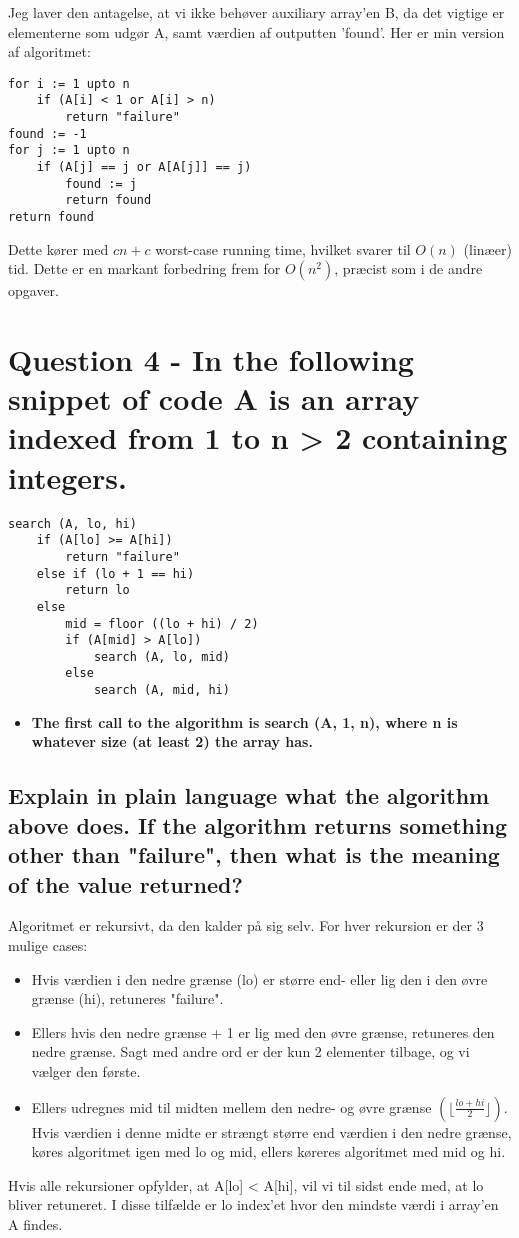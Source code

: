 \documentclass[a4paper,12pt]{article}
\begin{document}
Jeg laver den antagelse, at vi ikke behøver auxiliary array'en B, da det vigtige er elementerne som udgør A, samt værdien af outputten 'found'.
Her er min version af algoritmet:
\begin{lstlisting}
for i := 1 upto n                   
    if (A[i] < 1 or A[i] > n)       
        return "failure"            
found := -1                         
for j := 1 upto n                   
    if (A[j] == j or A[A[j]] == j)  
        found := j                  
        return found                
return found                        
\end{lstlisting}
Dette kører med $cn + c$ worst-case running time, hvilket svarer til $O(n)$ (linæer) tid. Dette er en markant forbedring frem for $O(n^2)$, præcist som i de andre opgaver.

\section[Question 4]{Question 4 - In the following snippet of code A is an array indexed from 1 to n > 2 containing integers.}

\begin{lstlisting}
search (A, lo, hi)
    if (A[lo] >= A[hi])
        return "failure"
    else if (lo + 1 == hi)
        return lo
    else 
        mid = floor ((lo + hi) / 2)
        if (A[mid] > A[lo])
            search (A, lo, mid)
        else
            search (A, mid, hi)
\end{lstlisting}
\begin{itemize}
    \item[] \textbf{The first call to the algorithm is search (A, 1, n), where n is whatever size (at least 2) the
    array has.}
\end{itemize}

\subsection[]{Explain in plain language what the algorithm above does. If the algorithm returns something other than "failure", then what is the meaning of the value returned?}
    
Algoritmet er rekursivt, da den kalder på sig selv. For hver rekursion er der 3 mulige cases:
\begin{itemize}
    \item Hvis værdien i den nedre grænse (lo) er større end- eller lig den i den øvre grænse (hi), retuneres "failure". 
    \item Ellers hvis den nedre grænse + 1 er lig med den øvre grænse, retuneres den nedre grænse. Sagt med andre ord er der kun 2 elementer tilbage, og vi vælger den første.
    \item Ellers udregnes mid til midten mellem den nedre- og øvre grænse $(\lfloor\frac{lo + hi}{2}\rfloor)$. Hvis værdien i denne midte er strængt større end værdien i den nedre grænse, køres algoritmet igen med lo og mid, ellers køreres algoritmet med mid og hi.
\end{itemize}
Hvis alle rekursioner opfylder, at A[lo] < A[hi], vil vi til sidst ende med, at lo bliver retuneret. I disse tilfælde er lo index'et hvor den mindste værdi i array'en A findes.
    
\end{document}
